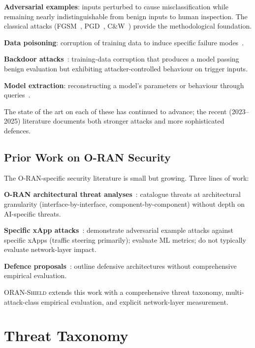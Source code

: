\documentclass[sigconf,nonacm]{acmart}
\begin{document}
\textbf{Adversarial examples}: inputs perturbed to cause
misclassification while remaining nearly indistinguishable from
benign inputs to human inspection. The classical attacks
(FGSM~\cite{goodfellow2014fgsm}, PGD~\cite{madry2018towards},
C\&W~\cite{carlini2017cw}) provide the methodological foundation.

\textbf{Data poisoning}: corruption of training data to induce
specific failure modes~\cite{biggio2012poisoning,steinhardt2017poisoning}.

\textbf{Backdoor attacks}~\cite{gu2019badnets,wang2024backdoor}:
training-data corruption that produces a model passing benign
evaluation but exhibiting attacker-controlled behaviour on
trigger inputs.

\textbf{Model extraction}: reconstructing a model's parameters or
behaviour through queries~\cite{tramer2016extraction}.

The state of the art on each of these has continued to advance;
the recent (2023--2025) literature documents both stronger
attacks and more sophisticated defences.

\subsection{Prior Work on O-RAN Security}

The O-RAN-specific security literature is small but growing.
Three lines of work:

\textbf{O-RAN architectural threat analyses}~\cite{ranaweera2023oransecurity,
brik2024oransec}: catalogue threats at architectural granularity
(interface-by-interface, component-by-component) without depth
on AI-specific threats.

\textbf{Specific xApp attacks}~\cite{naik2024xappadversarial}:
demonstrate adversarial example attacks against specific xApps
(traffic steering primarily); evaluate ML metrics; do not
typically evaluate network-layer impact.

\textbf{Defence proposals}~\cite{wong2024oranresilience}: outline
defensive architectures without comprehensive empirical
evaluation.

\textsc{ORAN-Shield} extends this work with a comprehensive
threat taxonomy, multi-attack-class empirical evaluation, and
explicit network-layer measurement.

\section{Threat Taxonomy}
\end{document}
